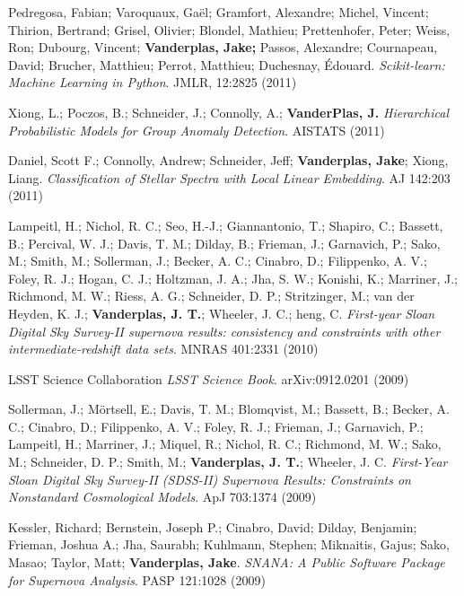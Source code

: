 {
\begin{packed_itemize}
   \item Pedregosa, Fabian; Varoquaux, Gaël; Gramfort, Alexandre;
         Michel, Vincent; Thirion, Bertrand; Grisel, Olivier;
         Blondel, Mathieu; Prettenhofer, Peter; Weiss, Ron; Dubourg, Vincent;
         {\bf Vanderplas, Jake;} Passos, Alexandre; Cournapeau, David;
         Brucher, Matthieu; Perrot, Matthieu; Duchesnay, Édouard.
         {\it Scikit-learn: Machine Learning in Python}.
         JMLR, 12:2825 (2011)
   \item Xiong, L.; Poczos, B.; Schneider, J.; Connolly, A.;
         {\bf VanderPlas, J.}
         {\it Hierarchical Probabilistic Models for Group Anomaly Detection}.
         AISTATS (2011)
   \item Daniel, Scott F.; Connolly, Andrew; Schneider, Jeff;
         {\bf Vanderplas, Jake}; Xiong, Liang.
         {\it Classification of Stellar Spectra with Local Linear Embedding}.
         AJ 142:203 (2011)
   \item Lampeitl, H.; Nichol, R. C.; Seo, H.-J.; Giannantonio, T.;
         Shapiro, C.; Bassett, B.; Percival, W. J.; Davis, T. M.; Dilday, B.;
         Frieman, J.; Garnavich, P.; Sako, M.; Smith, M.; Sollerman, J.;
         Becker, A. C.; Cinabro, D.; Filippenko, A. V.; Foley, R. J.;
         Hogan, C. J.; Holtzman, J. A.; Jha, S. W.; Konishi, K.; Marriner, J.;
         Richmond, M. W.; Riess, A. G.; Schneider, D. P.; Stritzinger, M.;
         van der Heyden, K. J.; {\bf Vanderplas, J. T.}; Wheeler, J. C.; 
         heng, C.
         {\it First-year Sloan Digital Sky Survey-II supernova results:
          consistency and constraints with other intermediate-redshift
          data sets}.
          MNRAS 401:2331 (2010)
   \item LSST Science Collaboration
         {\it LSST Science Book}.
         arXiv:0912.0201 (2009)
   \item Sollerman, J.; Mörtsell, E.; Davis, T. M.; Blomqvist, M.; Bassett, B.;
         Becker, A. C.; Cinabro, D.; Filippenko, A. V.; Foley, R. J.;
         Frieman, J.; Garnavich, P.; Lampeitl, H.; Marriner, J.; Miquel, R.;
         Nichol, R. C.; Richmond, M. W.; Sako, M.; Schneider, D. P.; Smith, M.;
         {\bf Vanderplas, J. T.}; Wheeler, J. C.
         {\it First-Year Sloan Digital Sky Survey-II (SDSS-II) Supernova
              Results: Constraints on Nonstandard Cosmological Models}.
         ApJ 703:1374 (2009)
   \item Kessler, Richard; Bernstein, Joseph P.; Cinabro, David;
         Dilday, Benjamin; Frieman, Joshua A.; Jha, Saurabh; Kuhlmann, Stephen;
         Miknaitis, Gajus; Sako, Masao; Taylor, Matt; {\bf Vanderplas, Jake}.
         {\it SNANA: A Public Software Package for Supernova Analysis}.
         PASP 121:1028 (2009)
\end{packed_itemize}
}
